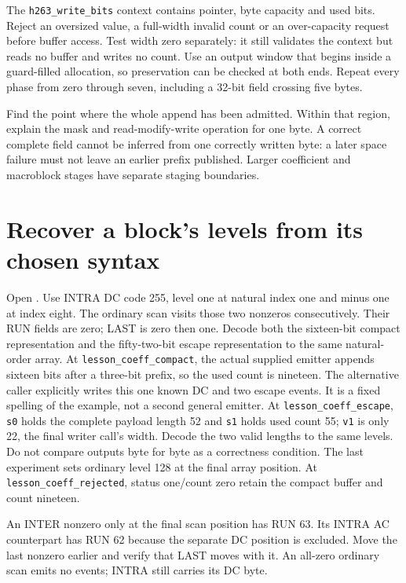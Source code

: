 The \texttt{h263\_write\_bits} context contains pointer, byte capacity and used
bits. Reject an oversized value, a full-width invalid count or an over-capacity
request before buffer access. Test width zero separately: it still validates the
context but reads no buffer and writes no count. Use an output window that begins
inside a guard-filled allocation, so preservation can be checked at both ends.
Repeat every phase from zero through seven, including a 32-bit field crossing
five bytes.

Find the point where the whole append has been admitted. Within that region,
explain the mask and read-modify-write operation for one byte. A correct complete
field cannot be inferred from one correctly written byte: a later space failure
must not leave an earlier prefix published. Larger coefficient and macroblock
stages have separate staging boundaries.

\section{Recover a block's levels from its chosen syntax}

Open . Use INTRA DC code 255, level one at natural index one and minus one at index eight.
The ordinary scan visits those two nonzeros consecutively. Their RUN fields are
zero; LAST is zero then one. Decode both the sixteen-bit compact representation
and the fifty-two-bit escape representation to the same natural-order array.
At \texttt{lesson\_coeff\_compact}, the actual supplied emitter appends sixteen
bits after a three-bit prefix, so the used count is nineteen. The alternative
caller explicitly writes this one known DC and two escape events. It is a fixed
spelling of the example, not a second general emitter. At
\texttt{lesson\_coeff\_escape}, \texttt{s0} holds the complete payload length
52 and \texttt{s1} holds used count 55; \texttt{v1} is only 22, the final
writer call's width. Decode the two valid lengths to the same levels. Do not
compare outputs byte for byte as a correctness condition. The last experiment
sets ordinary level 128 at the final array position. At
\texttt{lesson\_coeff\_rejected}, status one/count zero retain the compact
buffer and count nineteen.

An INTER nonzero only at the final scan position has RUN 63. Its INTRA AC
counterpart has RUN 62 because the separate DC position is excluded. Move the
last nonzero earlier and verify that LAST moves with it. An all-zero ordinary
scan emits no events; INTRA still carries its DC byte.

